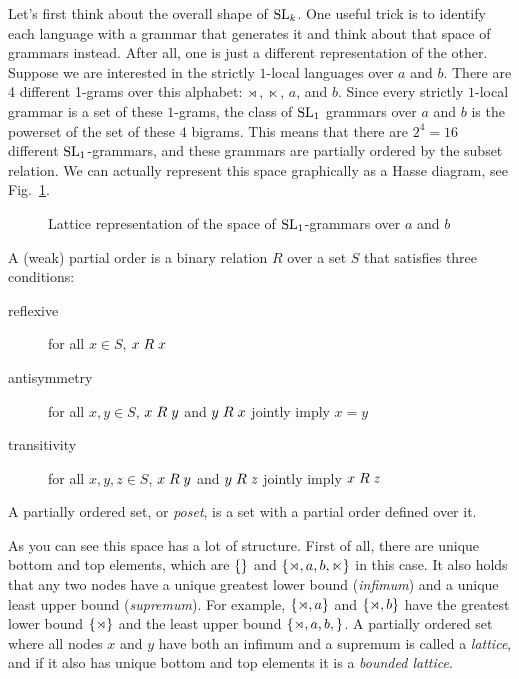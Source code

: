 Let's first think about the overall shape of $\SL_k$.
One useful trick is to identify each language with a grammar that generates it and think about that space of grammars instead.
After all, one is just a different representation of the other.
Suppose we are interested in the strictly $1$-local languages over $a$ and $b$.
There are 4 different 1-grams over this alphabet: $\LeftEdge$, $\RightEdge$, $a$, and $b$. 
Since every strictly $1$-local grammar is a set of these $1$-grams, the class of $\SL_1$ grammars over $a$ and $b$ is the powerset of the set of these $4$ bigrams.
This means that there are $2^4 = 16$ different $\SL_1$-grammars, and these grammars are partially ordered by the subset relation.
We can actually represent this space graphically as a Hasse diagram, see Fig.~\ref{fig:LearnSL_SL1-Lattice}.
%
\begin{figure}[htpb]
    \centering
    
    \caption{Lattice representation of the space of $\SL_1$-grammars over $a$ and $b$}
    \label{fig:LearnSL_SL1-Lattice}
\end{figure}
%
\begin{techinfo}
    A (weak) partial order is a binary relation $R$ over a set $S$ that satisfies three conditions:
    \begin{description}
        \item[reflexive] for all $x \in S$, $\binrel{R}{x}{x}$
        \item[antisymmetry] for all $x, y \in S$, $\binrel{R}{x}{y}$ and $\binrel{R}{y}{x}$ jointly imply $x = y$
        \item[transitivity] for all $x, y, z \in S$, $\binrel{R}{x}{y}$ and $\binrel{R}{y}{z}$ jointly imply $\binrel{R}{x}{z}$
    \end{description}
    A partially ordered set, or \emph{poset}, is a set with a partial order defined over it.
\end{techinfo}

As you can see this space has a lot of structure.
First of all, there are unique bottom and top elements, which are $\setof{}$ and $\setof{\LeftEdge, a, b, \RightEdge}$ in this case.
It also holds that any two nodes have a unique greatest lower bound (\emph{infimum}) and a unique least upper bound (\emph{supremum}).
For example, $\setof{\LeftEdge,a}$ and $\setof{\LeftEdge,b}$ have the greatest lower bound $\setof{\LeftEdge}$ and the least upper bound $\setof{\LeftEdge,a,b,}$.
A partially ordered set where all nodes $x$ and $y$ have both an infimum and a supremum is called a \emph{lattice}, and if it also has unique bottom and top elements it is a \emph{bounded lattice}.

